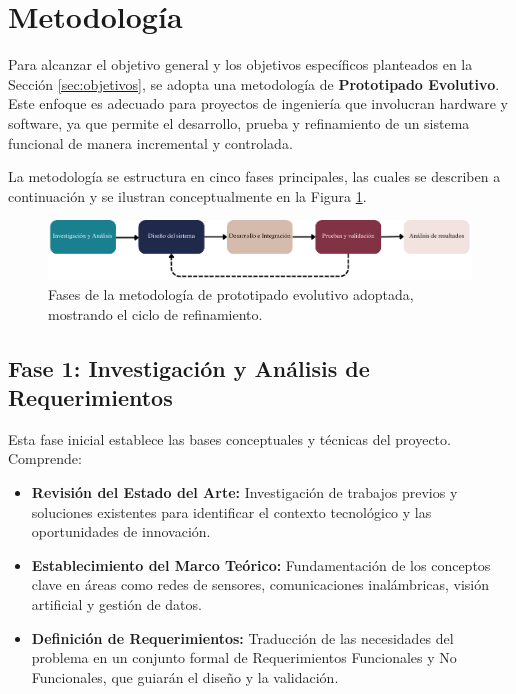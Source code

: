 \section{Metodología}
\label{sec:metodologia} 

Para alcanzar el objetivo general y los objetivos específicos planteados en la Sección \ref{sec:objetivos}, se adopta una metodología de \textbf{Prototipado Evolutivo}. Este enfoque es adecuado para proyectos de ingeniería que involucran hardware y software, ya que permite el desarrollo, prueba y refinamiento de un sistema funcional de manera incremental y controlada.

La metodología se estructura en cinco fases principales, las cuales se describen a continuación y se ilustran conceptualmente en la Figura \ref{fig:fases_metodologia}.

\begin{figure}[H]
    \centering
    \includegraphics[width=0.9\linewidth]{Documento/Imagenes/Metodologia/fases_proyecto.pdf}
    \caption{Fases de la metodología de prototipado evolutivo adoptada, mostrando el ciclo de refinamiento.}
    \label{fig:fases_metodologia}
\end{figure}

\subsection{Fase 1: Investigación y Análisis de Requerimientos} 
\label{subsec:met_fase1} 
Esta fase inicial establece las bases conceptuales y técnicas del proyecto. Comprende:
\begin{itemize}
    \item \textbf{Revisión del Estado del Arte:} Investigación de trabajos previos y soluciones existentes para identificar el contexto tecnológico y las oportunidades de innovación.
    \item \textbf{Establecimiento del Marco Teórico:} Fundamentación de los conceptos clave en áreas como redes de sensores, comunicaciones inalámbricas, visión artificial y gestión de datos.
    \item \textbf{Definición de Requerimientos:} Traducción de las necesidades del problema en un conjunto formal de Requerimientos Funcionales y No Funcionales, que guiarán el diseño y la validación.
\end{itemize}

